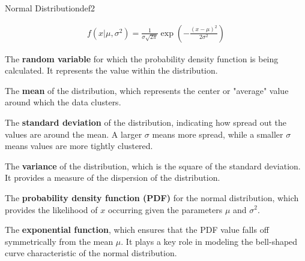\documentclass[
  12 pt,
  a4paper,
]{book}
\numberwithin{equation}{section}
\theoremstyle{plain}      %
\theoremstyle{definition} %
\theoremstyle{remark}     %
\theoremstyle{note}         %
\begin{document}
\newpage

\vspace*{\fill}

\begin{a_def_eq}{Normal Distribution}{def2} 

\begin{align}
 f(x | \mu, \sigma^2) = \frac{1}{\sigma \sqrt{2\pi}} \exp\left( - \frac{(x - \mu)^2}{2\sigma^2} \right)
\end{align}

\begin{description}[align=left, labelwidth=2cm, labelsep=0em, leftmargin=2cm]
    \item[$x$] The \textbf{random variable} for which the probability density function is being calculated. It represents the value within the distribution.
    \vspace{0.5\baselineskip}
    \item[$\mu$] The \textbf{mean} of the distribution, which represents the center or "average" value around which the data clusters.
    \vspace{0.5\baselineskip}
    \item[$\sigma$] The \textbf{standard deviation} of the distribution, indicating how spread out the values are around the mean. A larger $\sigma$ means more spread, while a smaller $\sigma$ means values are more tightly clustered.
    \vspace{0.5\baselineskip}
    \item[$\sigma^2$] The \textbf{variance} of the distribution, which is the square of the standard deviation. It provides a measure of the dispersion of the distribution.
    \vspace{0.5\baselineskip}
    \item[$f(x | \mu, \sigma^2)$] The \textbf{probability density function (PDF)} for the normal distribution, which provides the likelihood of $x$ occurring given the parameters $\mu$ and $\sigma^2$.
    \vspace{0.5\baselineskip}
    \item[$\exp$] The \textbf{exponential function}, which ensures that the PDF value falls off symmetrically from the mean $\mu$. It plays a key role in modeling the bell-shaped curve characteristic of the normal distribution.
\end{description}

\end{a_def_eq}

\hfill\break
\end{document}

